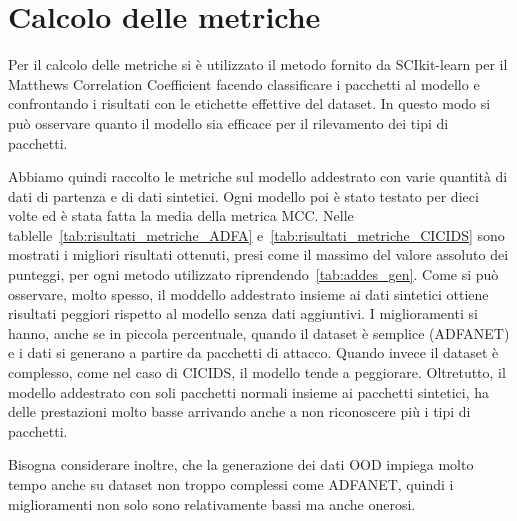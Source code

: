 \section{Calcolo delle metriche}

Per il calcolo delle metriche si è utilizzato il metodo fornito da SCIkit-learn per il Matthews Correlation Coefficient facendo classificare i pacchetti al modello e confrontando i risultati con le etichette effettive del dataset. In questo modo si può osservare quanto il modello sia efficace per il rilevamento dei tipi di pacchetti.

Abbiamo quindi raccolto le metriche sul modello addestrato con varie quantità di dati di partenza e di dati sintetici. Ogni modello poi è stato testato per dieci volte ed è stata fatta la media della metrica MCC. Nelle tablelle~\ref{tab:risultati_metriche_ADFA} e~\ref{tab:risultati_metriche_CICIDS} sono mostrati i migliori risultati ottenuti, presi come il massimo del valore assoluto dei punteggi, per ogni metodo utilizzato riprendendo~\ref{tab:addes_gen}. Come si può osservare, molto spesso, il moddello addestrato insieme ai dati sintetici ottiene risultati peggiori rispetto al modello senza dati aggiuntivi. I miglioramenti si hanno, anche se in piccola percentuale, quando il dataset è semplice (ADFANET) e i dati si generano a partire da pacchetti di attacco.
Quando invece il dataset è complesso, come nel caso di CICIDS, il modello tende a peggiorare.
Oltretutto, il modello addestrato con soli pacchetti normali insieme ai pacchetti sintetici, ha delle prestazioni molto basse arrivando anche a non riconoscere più i tipi di pacchetti.

Bisogna considerare inoltre, che la generazione dei dati OOD impiega molto tempo  anche su dataset non troppo complessi come ADFANET, quindi i miglioramenti non solo sono relativamente bassi ma anche onerosi.


\begin{table}\centering\setlength\tabcolsep{3.5pt}\renewcommand{}
  \noindent{}
\caption{\label{tab:risultati_metriche_ADFA} Risultati migliori ottenuti per ogni metodo sul dataset ADFANET}
\end{table}

